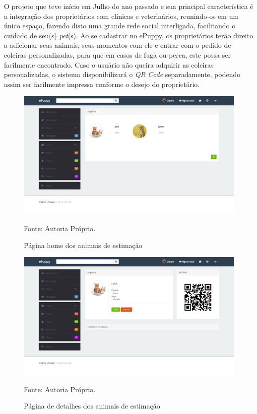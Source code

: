 O projeto que teve início em Julho do ano passado e sua principal característica é a integração dos proprietários com clínicas e veterinários, reunindo-os em um único espaço, fazendo disto uma grande rede social interligada, facilitando o cuidado de seu(s) {\it pet}(s). Ao se cadastrar no ePuppy, os proprietários terão direito a adicionar seus animais, seus momentos com ele e entrar com o pedido de coleiras personalizadas, para que em casos de fuga ou perca, este possa ser facilmente encontrado. Caso o usuário não queira adquirir as coleiras personalizadas, o sistema disponibilizará o {\it QR Code} separadamente, podendo assim ser facilmente impressa conforme o desejo do proprietário.
\begin{figure}[h!]
	\center	\includegraphics[scale=0.22
	]{imagens/animais1}
	\caption{Página home dos animais de estimação}
	Fonte: Autoria Própria.
	\label{Rotulo}
\end{figure}
\begin{figure}[h!]
	\center	\includegraphics[scale=0.22
	]{imagens/animais2}
	\caption{Página de detalhes dos animais de estimação}
	Fonte: Autoria Própria.
	\label{Rotulo}
\end{figure}

